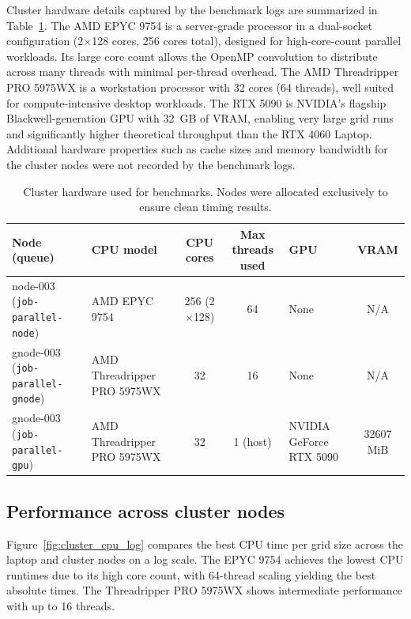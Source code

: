 \documentclass[conference]{IEEEtran}
\begin{document}
Cluster hardware details captured by the benchmark logs are summarized in Table~\ref{tab:cluster_hw}. The AMD EPYC 9754 is a server-grade processor in a dual-socket configuration (2$\times$128 cores, 256 cores total), designed for high-core-count parallel workloads. Its large core count allows the OpenMP convolution to distribute across many threads with minimal per-thread overhead. The AMD Threadripper PRO 5975WX is a workstation processor with 32 cores (64 threads), well suited for compute-intensive desktop workloads. The RTX 5090 is NVIDIA's flagship Blackwell-generation GPU with 32~GB of VRAM, enabling very large grid runs and significantly higher theoretical throughput than the RTX 4060 Laptop. Additional hardware properties such as cache sizes and memory bandwidth for the cluster nodes were not recorded by the benchmark logs.

\begin{table}[t]
\caption{Cluster hardware used for benchmarks. Nodes were allocated exclusively to ensure clean timing results.}
\label{tab:cluster_hw}
\begin{center}
\begin{tabularx}{\textwidth}{|l|X|c|c|l|c|}
\hline
\textbf{Node (queue)} & \textbf{CPU model} & \textbf{CPU cores} & \textbf{Max threads used} & \textbf{GPU} & \textbf{VRAM} \\
\hline
node-003 (\texttt{job-parallel-node}) & AMD EPYC 9754 & 256 (2$\times$128) & 64 & None & N/A \\
\hline
gnode-003 (\texttt{job-parallel-gnode}) & AMD Threadripper PRO 5975WX & 32 & 16 & None & N/A \\
\hline
gnode-003 (\texttt{job-parallel-gpu}) & AMD Threadripper PRO 5975WX & 32 & 1 (host) & NVIDIA GeForce RTX 5090 & 32607 MiB \\
\hline
\end{tabularx}
\end{center}
\end{table}

\subsection{Performance across cluster nodes}

Figure~\ref{fig:cluster_cpu_log} compares the best CPU time per grid size across the laptop and cluster nodes on a log scale. The EPYC 9754 achieves the lowest CPU runtimes due to its high core count, with 64-thread scaling yielding the best absolute times. The Threadripper PRO 5975WX shows intermediate performance with up to 16 threads.
\end{document}
